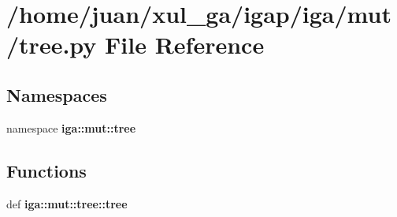 \section{/home/juan/xul\_\-ga/igap/iga/mut/tree.py File Reference}
\label{mut_2tree_8py}
\subsection*{Namespaces}
\begin{CompactItemize}
\item 
namespace {\bf iga::mut::tree}
\end{CompactItemize}
\subsection*{Functions}
\begin{CompactItemize}
\item 
def {\bf iga::mut::tree::tree}
\end{CompactItemize}
